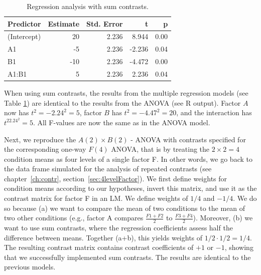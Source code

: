 \documentclass[
  12pt,
]{krantz}
\theoremstyle{definition}
\theoremstyle{definition}
\theoremstyle{definition}
\theoremstyle{definition}
\theoremstyle{remark}
\begin{document}
\begin{table}[h]

\caption{\label{tab:table18}Regression analysis with sum contrasts.}
\centering
\begin{tabular}[t]{lrrrr}
\toprule
Predictor & Estimate & Std. Error & t & p\\
\midrule
(Intercept) & 20 & 2.236 & 8.944 & 0.00\\
A1 & -5 & 2.236 & -2.236 & 0.04\\
B1 & -10 & 2.236 & -4.472 & 0.00\\
A1:B1 & 5 & 2.236 & 2.236 & 0.04\\
\bottomrule
\end{tabular}
\end{table}

When using sum contrasts, the results from the multiple regression models (see Table \ref{tab:table18}) are identical to the results from the ANOVA (see R output). Factor \(A\) now has \(t^2=-2.24^2 = 5\), factor \(B\) has \(t^2=-4.47^2 = 20\), and the interaction has \(t^22.24^2 = 5\). All F-values are now the same as in the ANOVA model.

Next, we reproduce the \(A(2) \times B(2)\) - ANOVA with contrasts specified for the corresponding one-way \(F(4)\) ANOVA, that is by treating the \(2 \times 2 = 4\) condition means as four levels of a single factor F. In other words, we go back to the data frame simulated for the analysis of repeated contrasts (see chapter~\ref{ch:contr}, section~\ref{sec:4levelFactor}). We first define weights for condition means according to our hypotheses, invert this matrix, and use it as the contrast matrix for factor F in an LM. We define weights of \(1/4\) and \(-1/4\). We do so because (a) we want to compare the mean of two conditions to the mean of two other conditions (e.g., factor A compares \(\frac{F1 + F2}{2}\) to \(\frac{F3 + F4}{2}\)). Moreover, (b) we want to use sum contrasts, where the regression coefficients assess half the difference between means. Together (a+b), this yields weights of \(1/2 \cdot 1/2 = 1/4\). The resulting contrast matrix contains contrast coefficients of \(+1\) or \(-1\), showing that we successfully implemented sum contrasts. The results are identical to the previous models.
\end{document}
